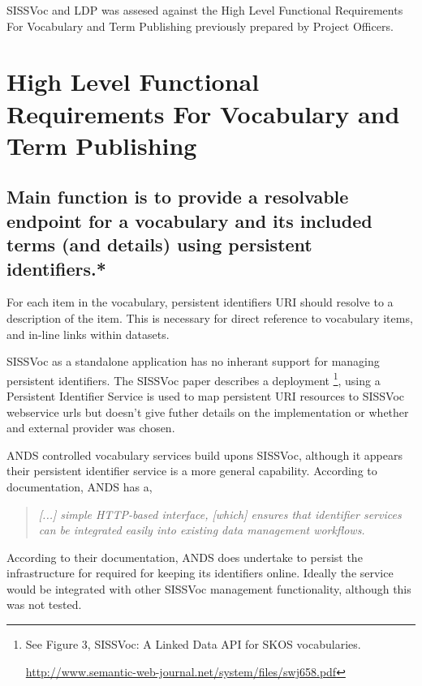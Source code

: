 \documentclass[10pt,a4paper]{article}
\newenvironment{italicquotes}
{\begin{quote}\itshape}
{\end{quote}}
\begin{document}
\begin{flushleft}
  \item[] SISSVoc and LDP was assesed against the High Level Functional Requirements For Vocabulary and Term Publishing previously
  prepared by Project Officers.
	



\section { 
	High Level Functional Requirements For Vocabulary and Term Publishing
}

  \subsection{
   Main function is to provide a resolvable endpoint for a vocabulary and its
  included terms (and details) using persistent identifiers.* 
  }

  For each item in the vocabulary, persistent identifiers {URI} should
  resolve to a description of the item.  This is necessary for direct reference to
  vocabulary items, and in-line links within datasets.

  \item[SISSVoc] as a standalone application has no inherant support for managing persistent
  identifiers. The SISSVoc paper describes a deployment \footnote{ See Figure 3,
  SISSVoc: A Linked Data API for SKOS vocabularies.

  \url{http://www.semantic-web-journal.net/system/files/swj658.pdf} }, using a
  Persistent Identifier Service is used to map persistent URI resources to SISSVoc
  webservice urls but doesn't give futher details on the implementation or
  whether and external provider was chosen. 

  \item[ANDS] controlled vocabulary services build upons SISSVoc, although it appears
  their persistent identifier service is a more general capability. According to
  documentation, ANDS has a, 

  \begin{italicquotes} [...] simple HTTP-based interface, [which] ensures that
  identifier services can be integrated easily into existing data management
  workflows.  \end{italicquotes}
  According to their documentation, ANDS does undertake to persist the infrastructure for required for
  keeping its identifiers online. Ideally the service would be integrated
  with other SISSVoc management functionality, although this was not tested.


\end{flushleft}
\end{document}
